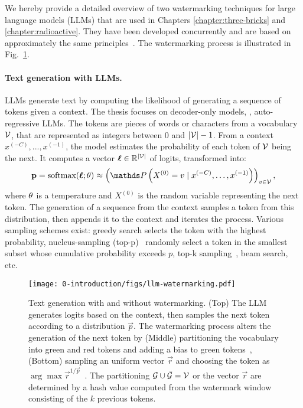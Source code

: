 We hereby provide a detailed overview of two watermarking techniques for large language models (\Glspl*{LLM}) that are used in Chapters \ref{chapter:three-bricks} and \ref{chapter:radioactive}.
They have been developed concurrently and are based on approximately the same principles~\citep{aaronson2023watermarking,kirchenbauer2023watermark}.
The watermarking process is illustrated in Fig.~\ref{chap0/fig:llm-watermarking}.

\paragraph*{Text generation with LLMs.} 
LLMs generate text by computing the likelihood of generating a sequence of tokens given a context.
The thesis focuses on decoder-only models, \aka, auto-regressive LLMs.
The \glspl*{token} are pieces of words or characters from a vocabulary $\mathcal{V}$, that are represented as integers between 0 and $|\mathcal{V}|-1$.
From a context $x^{(-C)}, ..., x^{(-1)}$, the model estimates the probability of each token of $\mathcal{V}$ being the next.
It computes a vector $\mathbf{\boldsymbol\ell}\in \mathbb{R}^{|\mathcal{V}|}$ of logits, transformed into:
\begin{equation}
    \vec{p} = \text{softmax}(\vec{\boldsymbol\ell};\temperature) \approx \left(\Prob \left( X^{(0)}= v \mid x^{(-C)},\dots, x^{(-1)} \right)\right)_{v\in\V},
    \label{chap0/eq:Distrib}
\end{equation}
where $\theta$ is a temperature and $X^{(0)}$ is the random variable representing the next token.
The generation of a sequence from the context samples a token from this distribution, then appends it to the context and iterates the process. 
Various sampling schemes exist: 
greedy search selects the token with the highest probability, 
nucleus-sampling (top-p)~\citep{holtzman2019curious} randomly select a token in the smallest subset whose cumulative probability exceeds $p$,
top-k sampling~\citep{fan2018hierarchical}, beam search, etc.


\begin{figure}[b!]
    \centering
    \texttt{[image: 0-introduction/figs/llm-watermarking.pdf]}
    \caption{
        Text generation with and without watermarking.
        (Top) The LLM generates logits based on the context, then samples the next token according to a distribution $\vec{p}$.
        The watermarking process alters the generation of the next token by 
        (Middle) partitioning the vocabulary into green and red tokens and adding a bias to green tokens~\citep{kirchenbauer2023watermark},
        (Bottom) sampling an uniform vector $\vec{r}$ and choosing the token as $\arg \max \vec{r}^{1/\vec{p}}$~\citep{aaronson2023watermarking}.
        The partitioning $\mathcal{G} \cup \bar{\mathcal{G}} = \mathcal{V}$ or the vector $\vec{r}$ are determined by a hash value computed from the watermark window consisting of the $k$ previous tokens.
    }
    \label{chap0/fig:llm-watermarking}
\end{figure}

